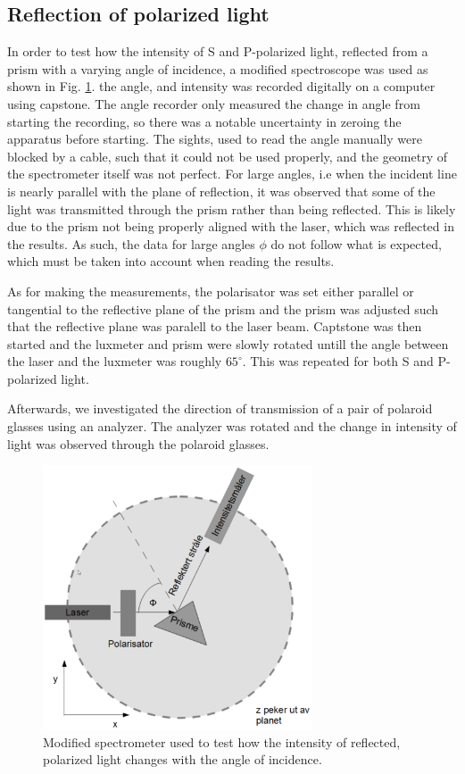 \documentclass[%
 reprint,
 amsmath,amssymb,
 aps,
]{revtex4-1}
\begin{document}
    \subsection{Reflection of polarized light\label{subsect:reflection_experimental}}
      In order to test how the intensity of S and P-polarized light, reflected from a prism with a varying angle of incidence, a modified spectroscope was used as shown in Fig. \ref{fig:mod_spectro}. the angle, and intensity was recorded digitally on a computer using capstone. The angle recorder only measured the change in angle from starting the recording, so there was a notable uncertainty in zeroing the apparatus before starting. The sights, used to read the angle manually were blocked by a cable, such that it could not be used properly, and the geometry of the spectrometer itself was not perfect. For large angles, i.e when the incident line is nearly parallel with the plane of reflection, it was observed that some of the light was transmitted through the prism rather than being reflected. This is likely due to the prism not being properly aligned with the laser, which was reflected in the results. As such, the data for large angles $\phi$ do not follow what is expected, which must be taken into account when reading the results.

      As for making the measurements, the polarisator was set either parallel or tangential to the reflective plane of the prism and the prism was adjusted such that the reflective plane was paralell to the laser beam. Captstone was then started and the luxmeter and prism were slowly rotated untill the angle between the laser and the luxmeter was roughly $65^\circ$. This was repeated for both S and P-polarized light.

      Afterwards, we investigated the direction of transmission of a pair of polaroid glasses using an analyzer. The analyzer was rotated and the change in intensity of light was observed through the polaroid glasses.

    \begin{figure}[h!]
      \center
      \includegraphics[width=8cm]{scripts/figs/modified_spectrometer.png}
      \caption{Modified spectrometer used to test how the intensity of reflected, polarized light changes with the angle of incidence.}
      \label{fig:mod_spectro}
    \end{figure}
\end{document}
